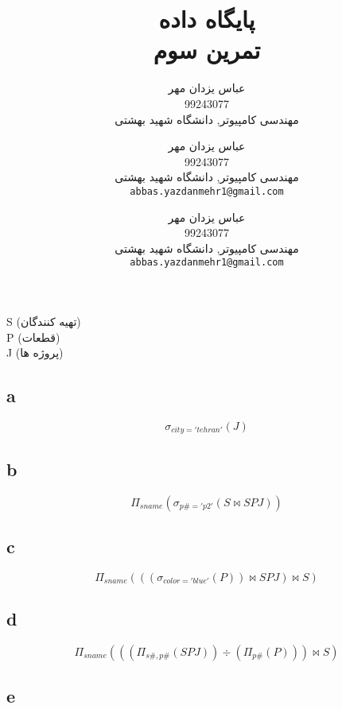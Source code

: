 \documentclass[a4paper]{article}
\author{\noindent
عباس یزدان مهر
\\
99243077\\
 مهندسی کامپیوتر, دانشگاه شهید بهشتی
\\
\emailone
	}
\makeatletter
\newcommand{\emailone}{\texttt{abbas.yazdanmehr1@gmail.com}}
\newcommand{\fulltitle}[2]{\title{#1 \\ #2}}
\newcommand{\myinf}{
	\author{\noindent
عباس یزدان مهر
\\
99243077\\
 مهندسی کامپیوتر, دانشگاه شهید بهشتی
\\
\emailone
	}
}
\makeatother
\begin{document}
\fulltitle{
پایگاه داده
}{
تمرین سوم
}

\myinf

\maketitle

\newpage


\noindent \myinf


\section{}
S (تهیه کنندگان) \\
P (قطعات) \\
J (پروژه ها) \\
\subsection*{a}

\begin{displaymath}
  \sigma_{city='tehran'}(J)
\end{displaymath}

\subsection*{b}

\begin{displaymath}
  \Pi_{sname}(\sigma_{p\#='p2'}(S \bowtie SPJ))
\end{displaymath}

\subsection*{c}

\begin{displaymath}
  \Pi_{sname}(((\sigma_{color='blue'}(P)) \bowtie SPJ) \bowtie S)
\end{displaymath}


\subsection*{d}

\begin{displaymath}
  \Pi_{sname}(((\Pi_{s\#, p\#}(SPJ)) \div (\Pi_{p\#}(P))) \bowtie S)
\end{displaymath}

\subsection*{e}
\end{document}
